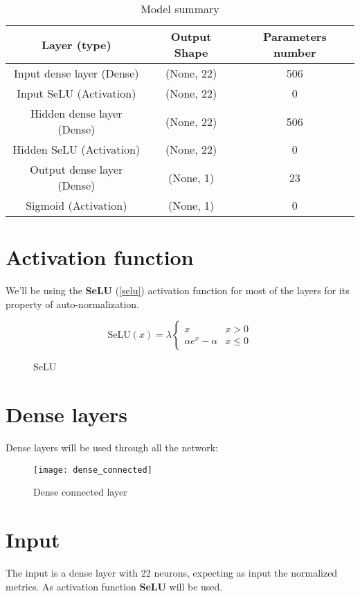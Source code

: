 \begin{table}
	\begin{tabular}{|c|c|c|}
		\hline
		\textbf{Layer (type)}      & \textbf{Output Shape} & \textbf{Parameters number} \\
		\hline
		Input dense layer (Dense)  & (None, 22)            & 506                        \\
		\hline
		Input SeLU (Activation)    & (None, 22)            & 0                          \\
		\hline
		Hidden dense layer (Dense) & (None, 22)            & 506                        \\
		\hline
		Hidden SeLU (Activation)   & (None, 22)            & 0                          \\
		\hline
		Output dense layer (Dense) & (None, 1)             & 23                         \\
		\hline
		Sigmoid (Activation)       & (None, 1)             & 0                          \\
		\hline
	\end{tabular}
	\caption{Model summary}
\end{table}

\section{Activation function}
We'll be using the \textbf{SeLU} (\ref{selu}) activation function for most of the layers for its property of auto-normalization.

\begin{figure}
	\[
		\text{SeLU}(x) = \lambda \begin{cases}
			x                 & x > 0    \\
			\alpha e^x-\alpha & x \leq 0
		\end{cases}
	\]
	\caption{SeLU}
\end{figure}

\section{Dense layers}
Dense layers will be used through all the network:
\begin{figure}
	\texttt{[image: dense\_connected]}
	\caption{Dense connected layer}
\end{figure}

\section{Input}
The input is a dense layer with 22 neurons, expecting as input the normalized metrics. As activation function \textbf{SeLU} will be used.

